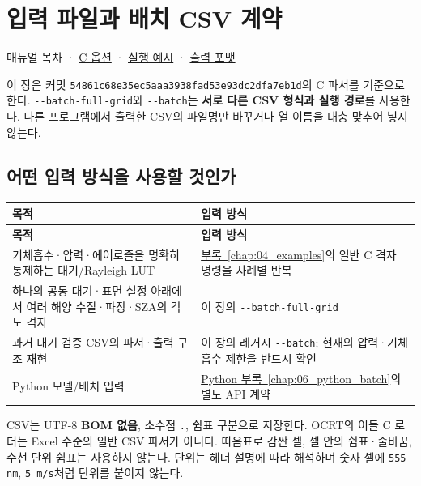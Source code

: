 \chapter{입력 파일과 배치 CSV 계약}
\label{chap:08_input_formats}
매뉴얼 목차 · \hyperref[chap:03_options]{C 옵션} · \hyperref[chap:04_examples]{실행 예시} · \hyperref[chap:05_output_formats]{출력 포맷}

이 장은 커밋 \texttt{54861c68e35ec5aa\allowbreak{}a3938fad53e93dc2\allowbreak{}dfa7eb1d}의 C 파서를 기준으로 한다. \texttt{-\allowbreak{}-\allowbreak{}batch-\allowbreak{}full-\allowbreak{}grid}와 \texttt{-\allowbreak{}-\allowbreak{}batch}는 \textbf{서로 다른 CSV 형식과 실행 경로}를 사용한다. 다른 프로그램에서 출력한 CSV의 파일명만 바꾸거나 열 이름을 대충 맞추어 넣지 않는다.

\section{어떤 입력 방식을 사용할 것인가}
\label{sec:auto:08_input_formats:1}

{\TableFont
\begin{longtable}{@{}>{\raggedright\arraybackslash}p{}>{\raggedright\arraybackslash}p{}@{}}
\toprule
\textbf{목적} & \textbf{입력 방식} \\
\midrule
\endfirsthead
\toprule
\textbf{목적} & \textbf{입력 방식} \\
\midrule
\endhead
\bottomrule
\endfoot
기체흡수·압력·에어로졸을 명확히 통제하는 대기/Rayleigh LUT & \hyperref[chap:04_examples]{부록~\ref*{chap:04_examples}}의 일반 C 격자 명령을 사례별 반복 \\
하나의 공통 대기·표면 설정 아래에서 여러 해양 수질·파장·SZA의 각도 격자 & 이 장의 \texttt{-\allowbreak{}-\allowbreak{}batch-\allowbreak{}full-\allowbreak{}grid} \\
과거 대기 검증 CSV의 파서·출력 구조 재현 & 이 장의 레거시 \texttt{-\allowbreak{}-\allowbreak{}batch}; 현재의 압력·기체흡수 제한을 반드시 확인 \\
Python 모델/배치 입력 & \hyperref[chap:06_python_batch]{Python 부록~\ref*{chap:06_python_batch}}의 별도 API 계약 \\
\end{longtable}
}

CSV는 UTF-8 \textbf{BOM 없음}, 소수점 \texttt{.\allowbreak{}}, 쉼표 구분으로 저장한다. OCRT의 이들 C 로더는 Excel 수준의 일반 CSV 파서가 아니다. 따옴표로 감싼 셀, 셀 안의 쉼표·줄바꿈, 수천 단위 쉼표는 사용하지 않는다. 단위는 헤더 설명에 따라 해석하며 숫자 셀에 \texttt{555 nm}, \texttt{5 m/\allowbreak{}s}처럼 단위를 붙이지 않는다.

